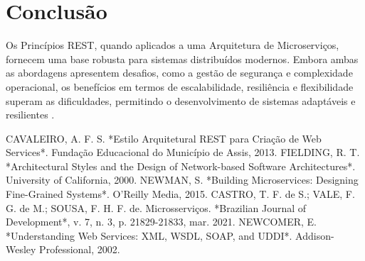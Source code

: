 \documentclass[12pt]{article}
\begin{document}
	\section{Conclusão}
	
	Os Princípios REST, quando aplicados a uma Arquitetura de Microserviços, fornecem uma base robusta para sistemas distribuídos modernos. Embora ambas as abordagens apresentem desafios, como a gestão de segurança e complexidade operacional, os benefícios em termos de escalabilidade, resiliência e flexibilidade superam as dificuldades, permitindo o desenvolvimento de sistemas adaptáveis e resilientes \cite{fielding2000}.
	
	
	\begin{thebibliography}{99}
		 CAVALEIRO, A. F. S. *Estilo Arquitetural REST para Criação de Web Services*. Fundação Educacional do Município de Assis, 2013.
		 FIELDING, R. T. *Architectural Styles and the Design of Network-based Software Architectures*. University of California, 2000.
		 NEWMAN, S. *Building Microservices: Designing Fine-Grained Systems*. O'Reilly Media, 2015.
		 CASTRO, T. F. de S.; VALE, F. G. de M.; SOUSA, F. H. F. de. Microsserviços. *Brazilian Journal of Development*, v. 7, n. 3, p. 21829-21833, mar. 2021.
		 NEWCOMER, E. *Understanding Web Services: XML, WSDL, SOAP, and UDDI*. Addison-Wesley Professional, 2002.
				
	\end{thebibliography}
	
\end{document}
